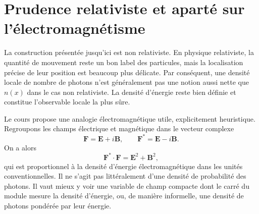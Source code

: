\section{Prudence relativiste et aparté sur l’électromagnétisme}

La construction présentée jusqu’ici est non relativiste. En physique relativiste, la quantité de mouvement reste un bon label des particules, mais la localisation précise de leur position est beaucoup plus délicate. Par conséquent, une densité locale de nombre de photons n’est généralement pas une notion aussi nette que \(n(x)\) dans le cas non relativiste. La densité d’énergie reste bien définie et constitue l’observable locale la plus sûre.

Le cours propose une analogie électromagnétique utile, explicitement heuristique. Regroupons les champs électrique et magnétique dans le vecteur complexe
\begin{equation}
\mathbf F=\mathbf E+i\mathbf B,
\qquad
\mathbf F^*=\mathbf E-i\mathbf B.
\label{eq:l07-riemann-silberstein}
\end{equation}
On a alors
\begin{equation}
\mathbf F^*\mathbin{\cdot}\mathbf F
=\mathbf E^2+\mathbf B^2,
\label{eq:l07-em-density}
\end{equation}
qui est proportionnel à la densité d’énergie électromagnétique dans les unités conventionnelles. Il ne s’agit pas littéralement d’une densité de probabilité des photons. Il vaut mieux y voir une variable de champ compacte dont le carré du module mesure la densité d’énergie, ou, de manière informelle, une densité de photons pondérée par leur énergie.

\begin{classroomqa}
\end{classroomqa}

\begin{classroomqa}
\end{classroomqa}

